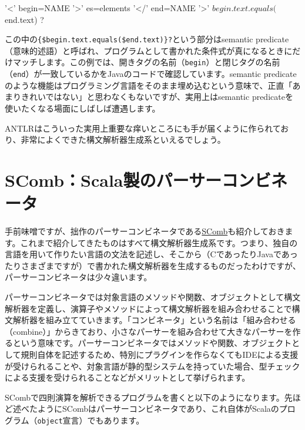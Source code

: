 \begin{codescreen}{}
'<' begin=NAME '>' es=elements '</' end=NAME '>' {
  $begin.text.equals($end.text)
}?
\end{codescreen}

この中の\texttt{\{\$begin.text.equals(\$end.text)\}?}という部分はsemantic
predicate（意味的述語）と呼ばれ、プログラムとして書かれた条件式が真になるときにだけマッチします。この例では、開きタグの名前（\texttt{begin}）と閉じタグの名前（\texttt{end}）が一致しているかをJavaのコードで確認しています。semantic
predicateのような機能はプログラミング言語をそのまま埋め込むという意味で、正直「あまりきれいではない」と思わなくもないですが、実用上はsemantic
predicateを使いたくなる場面にしばしば遭遇します。

ANTLRはこういった実用上重要な痒いところにも手が届くように作られており、非常によくできた構文解析器生成系といえるでしょう。

\section{SComb：Scala製のパーサーコンビネータ}

手前味噌ですが、拙作のパーサーコンビネータである\href{https://github.com/kmizu/scomb}{SComb}も紹介しておきます。これまで紹介してきたものはすべて構文解析器生成系です。つまり、独自の言語を用いて作りたい言語の文法を記述し、そこから（CであったりJavaであったりさまざまですが）で書かれた構文解析器を生成するものだったわけですが、パーサーコンビネータは少々違います。

パーサーコンビネータでは対象言語のメソッドや関数、オブジェクトとして構文解析器を定義し、演算子やメソッドによって構文解析器を組み合わせることで構文解析器を組み立てていきます。「コンビネータ」という名前は「組み合わせる（combine）」からきており、小さなパーサーを組み合わせて大きなパーサーを作るという意味です。パーサーコンビネータではメソッドや関数、オブジェクトとして規則自体を記述するため、特別にプラグインを作らなくてもIDEによる支援が受けられることや、対象言語が静的型システムを持っていた場合、型チェックによる支援を受けられることなどがメリットとして挙げられます。

SCombで四則演算を解析できるプログラムを書くと以下のようになります。先ほど述べたようにSCombはパーサーコンビネータであり、これ自体がScalaのプログラム（\texttt{object}宣言）でもあります。

